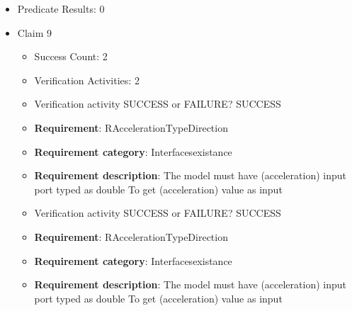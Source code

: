 \documentclass{article}
\begin{document}
\begin{itemize}
\begin{itemize}
						\item \textbf{Requirement}: RSteeringAngleTypeDirection 
						\item \textbf{Requirement category}: Interfacesexistance 
						\item \textbf{Requirement description}: The model must have (steering angle) input port typed as double To get (steering angle) value as input
					
					\item Verification activity SUCCESS or FAILURE? SUCCESS
		
						\item \textbf{Requirement}: RSteeringAngleTypeDirection 
						\item \textbf{Requirement category}: Interfacesexistance 
						\item \textbf{Requirement description}: The model must have (steering angle) input port typed as double To get (steering angle) value as input
					
				\end{itemize}
				
									    
				\item Predicate Results: 0

  				  \item Claim 9
				\begin{itemize}
			    	\item Success Count: 2 
			    	\item Verification Activities: 2
					\item Verification activity SUCCESS or FAILURE? SUCCESS
		
						\item \textbf{Requirement}: RAccelerationTypeDirection 
						\item \textbf{Requirement category}: Interfacesexistance 
						\item \textbf{Requirement description}: The model must have (acceleration) input port typed as double To get (acceleration) value as input
					
					\item Verification activity SUCCESS or FAILURE? SUCCESS
		
						\item \textbf{Requirement}: RAccelerationTypeDirection 
						\item \textbf{Requirement category}: Interfacesexistance 
						\item \textbf{Requirement description}: The model must have (acceleration) input port typed as double To get (acceleration) value as input
					

\end{itemize}
\end{itemize}
\end{document}
